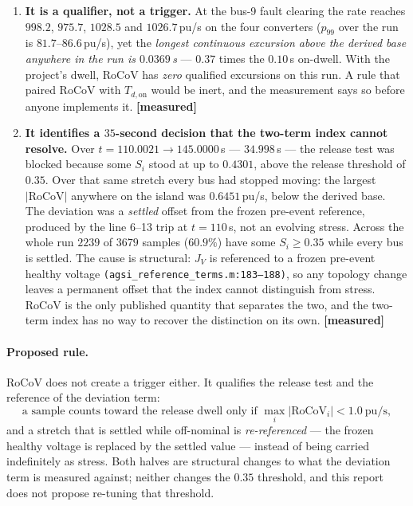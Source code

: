 \documentclass[12pt,a4paper]{article}
\theoremstyle{remark}
\newcommand{\Ssev}{S}
\newcommand{\code}[1]{\texttt{\small #1}}
\newcommand{\measured}{\textcolor{ok}{\textbf{[measured]}}}
\begin{document}
\begin{enumerate}[leftmargin=1.7em,itemsep=2.5pt]
\item \textbf{It is a qualifier, not a trigger.} At the bus-9 fault clearing the
      rate reaches $998.2$, $975.7$, $1028.5$ and $1026.7$\,pu/s on the four
      converters ($p_{99}$ over the run is $81.7$--$86.6$\,pu/s), yet the
      \emph{longest continuous excursion above the derived base anywhere in the
      run is $0.0369$\,s} --- $0.37$ times the $0.10$\,s on-dwell. With the
      project's dwell, RoCoV has \emph{zero} qualified excursions on this run. A
      rule that paired RoCoV with $T_{d,\mathrm{on}}$ would be inert, and the
      measurement says so before anyone implements it. \measured
\item \textbf{It identifies a $35$-second decision that the two-term index cannot
      resolve.} Over $t = 110.0021 \to 145.0000$\,s --- $34.998$\,s --- the
      release test was blocked because some $\Ssev_i$ stood at up to $0.4301$,
      above the release threshold of $0.35$. Over that same stretch every bus had
      stopped moving: the largest $|\mathrm{RoCoV}|$ anywhere on the island was
      $0.6451$\,pu/s, below the derived base. The deviation was a \emph{settled}
      offset from the frozen pre-event reference, produced by the line 6--13
      trip at $t = 110$\,s, not an evolving stress. Across the whole run $2239$
      of $3679$ samples ($60.9\%$) have some $\Ssev_i \ge 0.35$ while every bus
      is settled. The cause is structural: $J_V$ is referenced to a frozen
      pre-event healthy voltage \code{(agsi\_reference\_terms.m:183--188)}, so any
      topology change leaves a permanent offset that the index cannot distinguish
      from stress. RoCoV is the only published quantity that separates the two,
      and the two-term index has no way to recover the distinction on its own.
      \measured
\end{enumerate}

\paragraph{Proposed rule.} RoCoV does not create a trigger either. It qualifies
the release test and the reference of the deviation term:
\begin{equation}
\text{a sample counts toward the release dwell only if }
\max_i |\mathrm{RoCoV}_i| < 1.0\ \mathrm{pu/s},
\label{eq:ruleB}
\end{equation}
and a stretch that is settled while off-nominal is \emph{re-referenced} --- the
frozen healthy voltage is replaced by the settled value --- instead of being
carried indefinitely as stress. Both halves are structural changes to what the
deviation term is measured against; neither changes the $0.35$ threshold, and
this report does not propose re-tuning that threshold.
\end{document}
